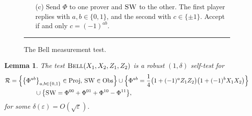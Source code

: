 \documentclass[11pt]{article}
\newtheorem{lemma}[theorem]{Lemma}
\theoremstyle{remark}
\theoremstyle{definition}
\newcommand{\Id}{\ensuremath{\mathop{\rm Id}\nolimits}}
\newcommand{\setft}[1]{\mathrm{#1}}
\newcommand{\Proj}{\setft{Proj}}
\newcommand{\Obs}{\setft{Obs}}
\newcommand{\eps}{\varepsilon}
\newcommand{\bellt}{\textsc{Bell}}
\newcommand{\SWAP}{\textsc{SW}}
\begin{document}
\begin{figure}[H]
\begin{itemize}
\begin{enumerate}
		\item[(c)] Send $\Phi$ to one prover and $\SWAP$ to the other. The first player replies with $a,b\in\{0,1\}$, and the second with $c\in \{\pm 1\}$. Accept if and only $c=(-1)^{ab}$. 
		\end{enumerate}
\end{itemize}
\rule[2ex]{16.5cm}{0.5pt}\vspace{-1cm}
\caption{The Bell measurement test.}
\label{fig:bell}
\end{figure}


\begin{lemma}\label{lem:bell-rigid-test}
The test $\bellt(X_1,X_2,Z_1,Z_2)$ is a robust $(1,\delta)$ self-test for 
\begin{align*}
\mathcal{R}&= \Big\{\big\{\Phi^{ab}\big\}_{a,b\in\{0,1\}}\in\Proj,\, \SWAP\in\Obs\Big\}\cup \Big\{\Phi^{ab} = \frac{1}{4}\big(1+(-1)^a Z_1Z_2\big)\big(1+(-1)^bX_1X_2\big) \Big\}\\
&\qquad\qquad \cup \big\{\SWAP = \Phi^{00}+\Phi^{01}+\Phi^{10}-\Phi^{11}\big\},
\end{align*}
 for some $\delta(\eps) = O(\sqrt{\eps})$.
\end{lemma}


\end{document}
